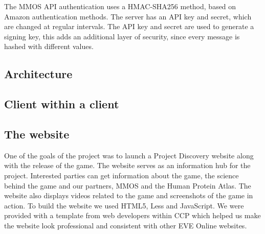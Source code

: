 	The MMOS API authentication uses a HMAC-SHA256 method, based on Amazon authentication methods. The server has an API key and secret, which are changed at regular intervals. The API key and secret are used to generate a signing key, this adds an additional layer of security, since every message is hashed with different values.

\subsection{Architecture}


\subsection{Client within a client}

\subsection{The website}
	One of the goals of the project was to launch a Project Discovery website along with the release of the game. The website serves as an information hub for the project. Interested parties can get information about the game, the science behind the game and our partners, MMOS and the Human Protein Atlas. The website also displays videos related to the game and screenshots of the game in action. To build the website we used HTML5, Less and JavaScript. We were provided with a template from web developers within CCP which helped us make the website look professional and consistent with other EVE Online websites.

